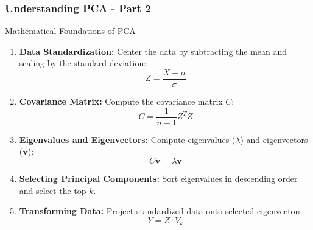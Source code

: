 \documentclass[aspectratio=169]{beamer}
\begin{document}
\begin{frame}[fragile]
    \frametitle{Understanding PCA - Part 2}
    \begin{block}{Mathematical Foundations of PCA}
        \begin{enumerate}
            \item \textbf{Data Standardization:} Center the data by subtracting the mean and scaling by the standard deviation:
            \begin{equation}
                Z = \frac{X - \mu}{\sigma}
            \end{equation}
            
            \item \textbf{Covariance Matrix:} Compute the covariance matrix \(C\):
            \begin{equation}
                C = \frac{1}{n-1} Z^TZ
            \end{equation}
            
            \item \textbf{Eigenvalues and Eigenvectors:} Compute eigenvalues (\(\lambda\)) and eigenvectors (\(\mathbf{v}\)):
            \begin{equation}
                C \mathbf{v} = \lambda \mathbf{v}
            \end{equation}

            \item \textbf{Selecting Principal Components:} Sort eigenvalues in descending order and select the top \(k\).
            
            \item \textbf{Transforming Data:} Project standardized data onto selected eigenvectors:
            \begin{equation}
                Y = Z \cdot V_k
            \end{equation}
        \end{enumerate}
    \end{block}
\end{frame}
\end{document}
